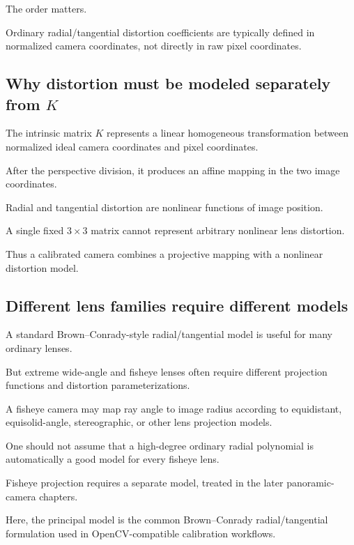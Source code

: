 The order matters.

Ordinary radial/tangential distortion coefficients are typically defined in normalized camera coordinates, not directly in raw pixel coordinates.

\subsection{\texorpdfstring{Why distortion must be modeled separately from \(K\)}{Why distortion must be modeled separately from K}}\label{02-foundations-ii-ch035-why-distortion-must-be-modeled-separately-from-k}

The intrinsic matrix \(K\) represents a linear homogeneous transformation between normalized ideal camera coordinates and pixel coordinates.

After the perspective division, it produces an affine mapping in the two image coordinates.

Radial and tangential distortion are nonlinear functions of image position.

A single fixed \(3\times3\) matrix cannot represent arbitrary nonlinear lens distortion.

Thus a calibrated camera combines a projective mapping with a nonlinear distortion model.

\subsection{Different lens families require different models}\label{02-foundations-ii-ch035-different-lens-families-require-different-models}

A standard Brown--Conrady-style radial/tangential model is useful for many ordinary lenses.

But extreme wide-angle and fisheye lenses often require different projection functions and distortion parameterizations.

A fisheye camera may map ray angle to image radius according to equidistant, equisolid-angle, stereographic, or other lens projection models.

One should not assume that a high-degree ordinary radial polynomial is automatically a good model for every fisheye lens.

Fisheye projection requires a separate model, treated in the later panoramic-camera chapters.

Here, the principal model is the common Brown--Conrady radial/tangential formulation used in OpenCV-compatible calibration workflows. 

